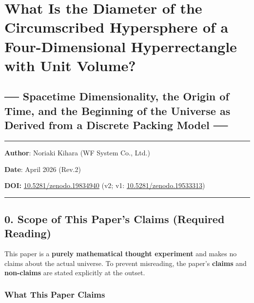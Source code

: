 \documentclass[a4paper,11pt]{article}
\theoremstyle{definition}
\begin{document}
\section{What Is the Diameter of the Circumscribed Hypersphere of a
Four-Dimensional Hyperrectangle with Unit
Volume?}\label{what-is-the-diameter-of-the-circumscribed-hypersphere-of-a-four-dimensional-hyperrectangle-with-unit-volume}

\subsection{── Spacetime Dimensionality, the Origin of Time, and the
Beginning of the Universe as Derived from a Discrete Packing Model
──}\label{spacetime-dimensionality-the-origin-of-time-and-the-beginning-of-the-universe-as-derived-from-a-discrete-packing-model}

\begin{center}\rule{0.5\linewidth}{0.5pt}\end{center}

\textbf{Author}: Noriaki Kihara (WF System Co., Ltd.)

\textbf{Date}: April 2026 (Rev.2)

\textbf{DOI:}
\href{https://doi.org/10.5281/zenodo.19834940}{10.5281/zenodo.19834940}
(v2; v1:
\href{https://doi.org/10.5281/zenodo.19533313}{10.5281/zenodo.19533313})

\begin{center}\rule{0.5\linewidth}{0.5pt}\end{center}

\subsection{0. Scope of This Paper's Claims (Required
Reading)}\label{scope-of-this-papers-claims-required-reading}

This paper is a \textbf{purely mathematical thought experiment} and
makes no claims about the actual universe. To prevent misreading, the
paper's \textbf{claims} and \textbf{non-claims} are stated explicitly at
the outset.

\subsubsection{What This Paper Claims}\label{what-this-paper-claims}
\end{document}
